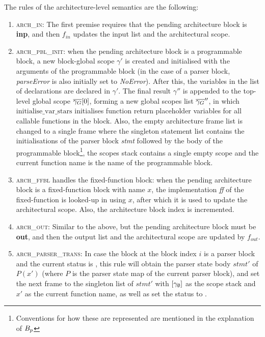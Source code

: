 \documentclass[UTF8]{article}
\begin{document}
The rules of the architecture-level semantics are the following:
\begin{enumerate}
\item \textsc{arch\_in}: The first premise requires that the pending architecture block is \textbf{inp}, and then $f_{ \mathit{in} }$ updates the input list and the architectural scope.

\item \textsc{arch\_pbl\_init}: when the pending architecture block is a programmable block, a new block-global scope $\gamma'$ is created and initialised with the arguments of the programmable block (in the case of a parser block, \textit{parseError} is also initially set to \textit{NoError}). After this, the variables in the list of declarations are declared in $\gamma'$. The final result $\gamma''$ is appended to the top-level global scope $\overline{\gamma_G}[0]$, forming a new global scopes list $\overline{\gamma_G}''$, in which $\mathrm{initialise\_var\_stars}$ initialises function return placeholder variables for all callable functions in the block. Also, the empty architecture frame list is changed to a single frame where the singleton statement list contains the initialisations of the parser block \textit{stmt} followed by the body of the programmable block\footnote{Conventions for how these are represented are mentioned in the explanation of $B_p$}, the scopes stack contains a single empty scope and the current function name is the name of the programmable block.

\item \textsc{arch\_ffbl} handles the fixed-function block: when the pending architecture block is a fixed-function block with name $x$, the implementation \textit{ff} of the fixed-function is looked-up in \ffbm{} using $x$, after which it is used to update the architectural scope. Also, the architecture block index is incremented.

\item \textsc{arch\_out}: Similar to the above, but the pending architecture block must be \textbf{out}, and then the output list and the architectural scope are updated by $f_{ \mathit{out} }$.

\item \textsc{arch\_parser\_trans}: In case the block at the block index $i$ is a parser block and the current status is , this rule will obtain the parser state body $\mathit{stmt}'$ of $P(x')$ (where $P$ is the parser state map of the current parser block), and set the next frame to the singleton list of $\mathit{stmt}'$ with $[{\gamma}_{\emptyset}{}]$ as the scope stack and $x'$ as the current function name, as well as set the status to \running{}.


\end{enumerate}
\end{document}
